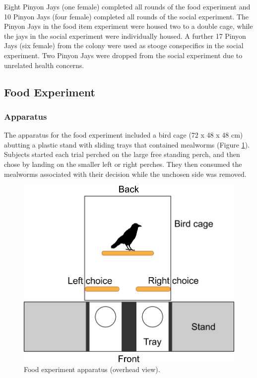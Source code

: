 \documentclass[
  ,doc,floatsintext]{apa6}
\begin{document}
Eight Pinyon Jays (one female) completed all rounds of the food experiment and 10 Pinyon Jays (four female) completed all rounds of the social experiment. The Pinyon Jays in the food item experiment were housed two to a double cage, while the jays in the social experiment were individually housed. A further 17 Pinyon Jays (six female) from the colony were used as stooge conspecifics in the social experiment. Two Pinyon Jays were dropped from the social experiment due to unrelated health concerns.

\hypertarget{food-experiment}{%
\subsection{Food Experiment}\label{food-experiment}}

\hypertarget{apparatus}{%
\subsubsection{Apparatus}\label{apparatus}}

The apparatus for the food experiment included a bird cage (72 x 48 x 48 cm) abutting a plastic stand with sliding trays that contained mealworms (Figure \ref{fig:foodapp}). Subjects started each trial perched on the large free standing perch, and then chose by landing on the smaller left or right perches. They then consumed the mealworms associated with their decision while the unchosen side was removed.



\begin{figure}

{\centering \includegraphics[width=1\linewidth]{../figures/food_apparatus} 

}

\caption{Food experiment apparatus (overhead view).}\label{fig:foodapp}
\end{figure}
\end{document}
